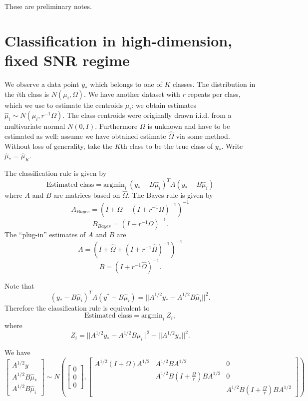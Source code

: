 \documentclass[12pt]{article}
\begin{document}
\maketitle

\newcommand{\tr}{\text{tr}}
\newcommand{\E}{\textbf{E}}
\newcommand{\diag}{\text{diag}}
\newcommand{\argmax}{\text{argmax}}
\newcommand{\Cov}{\text{Cov}}
\newcommand{\Var}{\text{Var}}
\newcommand{\argmin}{\text{argmin}}
\newcommand{\Vol}{\text{Vol}}
\newcommand{\comm}[1]{}

These are preliminary notes.

\section{Classification in high-dimension, fixed SNR regime}

We observe a data point $y_*$ which belongs to one of $K$ classes.
The distribution in the $i$th class is $N(\mu_i, \Omega)$.  We have
another dataset with $r$ repeats per class, which we use to estimate
the centroids $\mu_i$: we obtain estimates $\hat{\mu}_i \sim N(\mu_i,
r^{-1} \Omega)$.  The class centroids were originally drawn
i.i.d. from a multivariate normal $N(0, I)$.  Furthermore $\Omega$ is
unknown and have to be estimated as well: assume we have obtained
estimate $\hat{\Omega}$ via some method.  Without loss of generality,
take the $K$th class to be the true class of $y_*$.  Write
$\hat{\mu}_* = \hat{\mu}_K$.

The classification rule is given by
\[
\text{Estimated class} = \argmin_{i}\ (y_* - B\hat{\mu}_i)^T A (y_* - B\hat{\mu}_i)
\]
where $A$ and $B$ are matrices based on $\hat{\Omega}$.
The Bayes rule is given by
\[
A_{Bayes} = (I + \Omega - (I + r^{-1}\Omega)^{-1})^{-1}
\]
\[
B_{Bayes} = (I + r^{-1} \Omega)^{-1}.
\]
The ``plug-in'' estimates of $A$ and $B$ are
\[
A = (I + \hat{\Omega} + (I + r^{-1}\hat{\Omega})^{-1})^{-1}
\]
\[
B = (I + r^{-1} \hat{\Omega})^{-1}.
\]

Note that
\[
(y_* - B\hat{\mu}_i)^T A (y^* - B\hat{\mu}_i) =
||A^{1/2} y_* - A^{1/2} B\hat{\mu}_i||^2.
\]
Therefore the classification rule is equivalent to 
\[
\text{Estimated class} = \argmin_{i}\ Z_i,
\]
where
\[
Z_i = ||A^{1/2} y_* - A^{1/2} B\hat{\mu}_i||^2 - ||A^{1/2} y_*||^2.
\]

We have
\[
\begin{bmatrix}
A^{1/2} y \\
A^{1/2} B \hat{\mu}_*\\
A^{1/2} B \hat{\mu}_i
\end{bmatrix}
\sim
N\left(
\begin{bmatrix}
0\\0\\0
\end{bmatrix},
\begin{bmatrix}
A^{1/2}(I + \Omega) A^{1/2} & A^{1/2}B A^{1/2} & 0\\
 & A^{1/2}B(I + \frac{\Omega}{r})BA^{1/2} & 0\\
 & & A^{1/2}B(I + \frac{\Omega}{r})BA^{1/2}
\end{bmatrix}
\right)
\]
\end{document}
